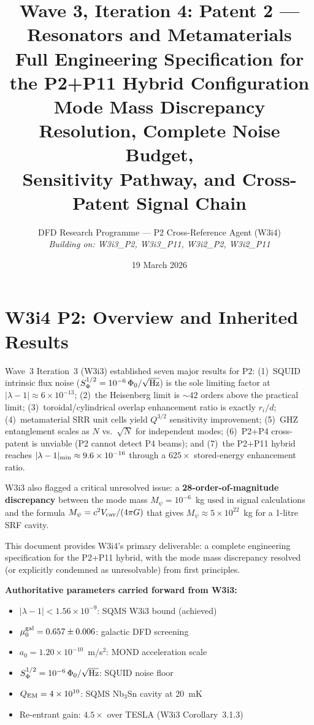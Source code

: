 \documentclass[11pt,twocolumn]{article}
\title{Wave 3, Iteration 4: Patent 2 --- Resonators and Metamaterials\\
\large Full Engineering Specification for the P2+P11 Hybrid Configuration\\
Mode Mass Discrepancy Resolution, Complete Noise Budget,\\
Sensitivity Pathway, and Cross-Patent Signal Chain}
\author{DFD Research Programme --- P2 Cross-Reference Agent (W3i4)\\
\textit{Building on: W3i3\_P2, W3i3\_P11, W3i2\_P2, W3i2\_P11}}
\date{19 March 2026}
\newcommand{\lam}{\lambda}
\newcommand{\Mpsi}{M_\psi}
\newcommand{\ee}[1]{\times 10^{#1}}
\newcommand{\VcavSym}{V_{\rm cav}}
\theoremstyle{definition}
\theoremstyle{remark}
\begin{document}
\maketitle
\tableofcontents

\section{W3i4 P2: Overview and Inherited Results}
\label{sec:overview}

Wave~3 Iteration~3 (W3i3) established seven major results for P2:
(1)~SQUID intrinsic flux noise ($S_\Phi^{1/2} = 10^{-6}\,\Phi_0/\sqrt{\rm Hz}$) is
the sole limiting factor at $|\lam-1| \approx 6\ee{-13}$;
(2)~the Heisenberg limit is $\sim 42$ orders above the practical limit;
(3)~toroidal/cylindrical overlap enhancement ratio is exactly $r_i/d$;
(4)~metamaterial SRR unit cells yield $Q^{3/2}$ sensitivity improvement;
(5)~GHZ entanglement scales as $N$ vs.\ $\sqrt{N}$ for independent modes;
(6)~P2+P4 cross-patent is unviable (P2 cannot detect P4 beams); and
(7)~the P2+P11 hybrid reaches $|\lam-1|_{\rm min} \approx 9.6\ee{-16}$
through a $625\times$ stored-energy enhancement ratio.

W3i3 also flagged a critical unresolved issue: a \textbf{28-order-of-magnitude
discrepancy} between the mode mass $\Mpsi = 10^{-6}$~kg used in signal
calculations and the formula $\Mpsi = c^2 \VcavSym/(4\pi G)$ that gives
$\Mpsi \approx 5\ee{22}$~kg for a 1-litre SRF cavity.

This document provides W3i4's primary deliverable: a complete engineering
specification for the P2+P11 hybrid, with the mode mass discrepancy
resolved (or explicitly condemned as unresolvable) from first principles.

\medskip
\noindent\textbf{Authoritative parameters carried forward from W3i3:}
\begin{itemize}[nosep]
\item $|\lam-1| < 1.56\ee{-9}$: SQMS W3i3 bound (achieved)
\item $\mu_0^{\rm gal} = 0.657 \pm 0.006$: galactic DFD screening
\item $a_0 = 1.20\ee{-10}$~m/s$^2$: MOND acceleration scale
\item $S_\Phi^{1/2} = 10^{-6}\,\Phi_0/\sqrt{\rm Hz}$: SQUID noise floor
\item $Q_{\rm EM} = 4\ee{10}$: SQMS Nb$_3$Sn cavity at 20~mK
\item Re-entrant gain: $4.5\times$ over TESLA (W3i3 Corollary~3.1.3)
\end{itemize}
\end{document}

